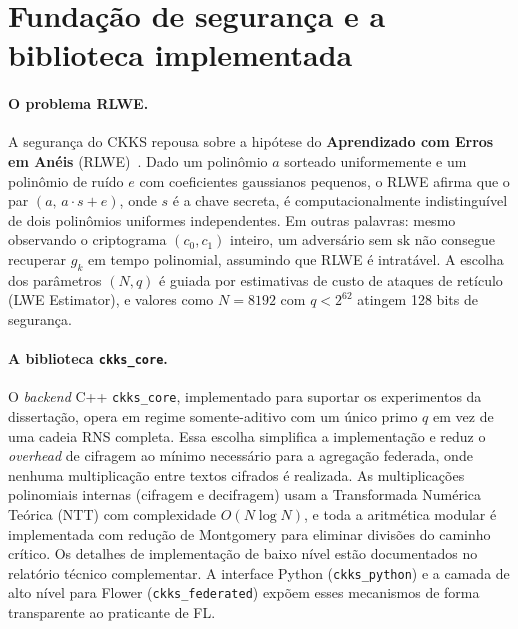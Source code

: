 \documentclass[11pt,a4paper]{article}
\begin{document}
\section{Fundação de segurança e a biblioteca implementada}
\label{sec:seguranca}

\paragraph{O problema RLWE.}
A segurança do CKKS repousa sobre a hipótese do \textbf{Aprendizado com Erros em Anéis}
(RLWE)~\cite{LPR2010}. Dado um polinômio $a$ sorteado uniformemente e um polinômio de
ruído $e$ com coeficientes gaussianos pequenos, o RLWE afirma que o par
$(a,\, a \cdot s + e)$, onde $s$ é a chave secreta, é computacionalmente
indistinguível de dois polinômios uniformes independentes. Em outras palavras: mesmo
observando o criptograma $(c_0, c_1)$ inteiro, um adversário sem $\text{sk}$ não
consegue recuperar $g_k$ em tempo polinomial, assumindo que RLWE é intratável. A
escolha dos parâmetros $(N, q)$ é guiada por estimativas de custo de ataques de
retículo (LWE Estimator), e valores como $N=8192$ com $q < 2^{62}$ atingem 128 bits
de segurança.

\paragraph{A biblioteca \texttt{ckks\_core}.}
O \emph{backend} C++ \texttt{ckks\_core}, implementado para suportar os experimentos
da dissertação, opera em regime somente-aditivo com um único primo $q$ em vez de uma
cadeia RNS completa. Essa escolha simplifica a implementação e reduz o \emph{overhead}
de cifragem ao mínimo necessário para a agregação federada, onde nenhuma multiplicação
entre textos cifrados é realizada. As multiplicações polinomiais internas (cifragem e
decifragem) usam a Transformada Numérica Teórica (NTT) com complexidade $O(N\log N)$,
e toda a aritmética modular é implementada com redução de Montgomery para eliminar
divisões do caminho crítico. Os detalhes de implementação de baixo nível estão
documentados no relatório técnico complementar. A interface Python (\texttt{ckks\_python})
e a camada de alto nível para Flower (\texttt{ckks\_federated}) expõem esses
mecanismos de forma transparente ao praticante de FL.
\end{document}
